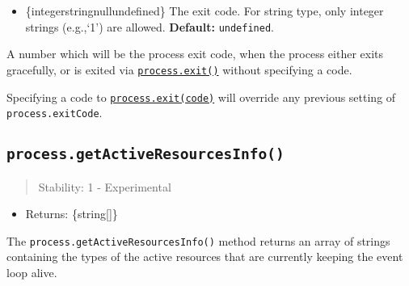 \begin{itemize}
\tightlist
\item
  \{integer\textbar string\textbar null\textbar undefined\} The exit
  code. For string type, only integer strings (e.g.,`1') are allowed.
  \textbf{Default:} \texttt{undefined}.
\end{itemize}

A number which will be the process exit code, when the process either
exits gracefully, or is exited via
\hyperref[processexitcode]{\texttt{process.exit()}} without specifying a
code.

Specifying a code to
\hyperref[processexitcode]{\texttt{process.exit(code)}} will override
any previous setting of \texttt{process.exitCode}.

\subsection{\texorpdfstring{\texttt{process.getActiveResourcesInfo()}}{process.getActiveResourcesInfo()}}\label{process.getactiveresourcesinfo}

\begin{quote}
Stability: 1 - Experimental
\end{quote}

\begin{itemize}
\tightlist
\item
  Returns: \{string{[}{]}\}
\end{itemize}

The \texttt{process.getActiveResourcesInfo()} method returns an array of
strings containing the types of the active resources that are currently
keeping the event loop alive.

